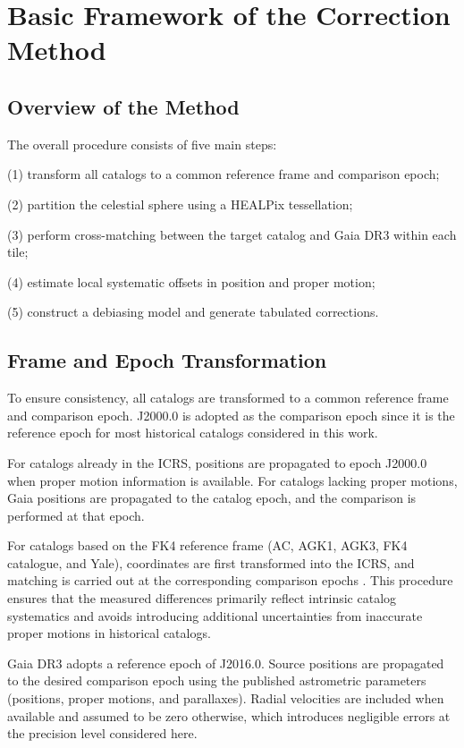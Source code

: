 \documentclass[linenumbers,amsmath,manuscript]{aastex702}
\begin{document}
\section{Basic Framework of the Correction Method} \label{sec:methods}

\subsection{Overview of the Method}

The overall procedure consists of five main steps: 

(1) transform all catalogs to a common reference frame and comparison epoch; 

(2) partition the celestial sphere using a HEALPix tessellation; 

(3) perform cross-matching between the target catalog and Gaia DR3 within each tile; 

(4) estimate local systematic offsets in position and proper motion; 

(5) construct a debiasing model and generate tabulated corrections.

\subsection{Frame and Epoch Transformation}

To ensure consistency, all catalogs are transformed to a common reference frame and comparison epoch. J2000.0 is adopted as the comparison epoch since it is the reference epoch for most historical catalogs considered in this work.

For catalogs already in the ICRS, positions are propagated to epoch J2000.0 when proper motion information is available. For catalogs lacking proper motions, Gaia positions are propagated to the catalog epoch, and the comparison is performed at that epoch. 

For catalogs based on the FK4 reference frame (AC, AGK1, AGK3, FK4 catalogue, and Yale), coordinates are first transformed into the ICRS, and matching is carried out at the corresponding comparison epochs \citep{Murray1989,Ma1998ICRF,Fey2015}. This procedure ensures that the measured differences primarily reflect intrinsic catalog systematics and avoids introducing additional uncertainties from inaccurate proper motions in historical catalogs.

Gaia DR3 adopts a reference epoch of J2016.0. Source positions are propagated to the desired comparison epoch using the published astrometric parameters (positions, proper motions, and parallaxes). Radial velocities are included when available and assumed to be zero otherwise, which introduces negligible errors at the precision level considered here.
\end{document}
